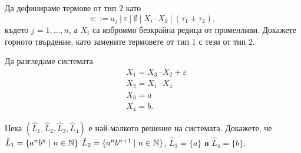 \begin{problem}
  Да дефинираме термове от тип 2 като
  \[\tau ::= a_j\ |\ \varepsilon\ |\ \emptyset\ |\ X_i \cdot X_k\ |\ (\tau_1 + \tau_2),\]
  където $j = 1, \dots,n$, а $X_i$ са изброимо безкрайна редица от променливи.
  Докажете горното твърдение, като замените термовете от тип 1 с тези от тип 2.
\end{problem}

\begin{example}
  Да разгледаме системата
  \begin{align*}
    & X_1 = X_3 \cdot X_2 + \varepsilon\\
    & X_2 = X_1 \cdot X_4\\
    & X_3 = a\\
    & X_4 = b.
  \end{align*}


  Нека $(\hat{L}_1, \hat{L}_2, \hat{L}_3, \hat{L}_4)$ е най-малкото решение на системата.
  Докажете, че $\hat{L}_1 = \{a^nb^n\mid n \in \mathbb{N}\}$ $\hat{L}_2 = \{a^nb^{n+1}\mid n \in \mathbb{N}\}$,
  $\hat{L}_3 = \{a\}$ и $\hat{L}_4 = \{b\}$.
\end{example}


